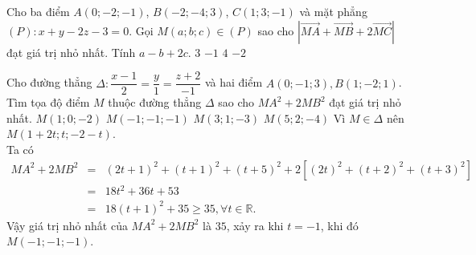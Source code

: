 \begin{ex}
	Cho ba điểm $A(0;-2;-1)$, $B(-2;-4;3)$, $C(1;3;-1)$ và mặt phẳng $(P)\colon x+y-2z-3=0$. Gọi $M(a;b;c)\in (P)$ sao cho $\left|\vec{MA}+\vec{MB}+2\vec{MC}\right|$ đạt giá trị nhỏ nhất. Tính $a-b+2c$.
	\choice
	{$3$}
	{$-1$}
	{$4$}
	{\True $-2$}
\end{ex}
\begin{ex}%
	Cho đường thẳng $\Delta \colon \dfrac{x-1}{2}=\dfrac{y}{1}=\dfrac{z+2}{-1}$ và hai điểm $A(0;-1;3), B(1;-2;1)$. Tìm tọa độ điểm $M$ thuộc đường thẳng $\Delta$ sao cho $MA^2+2MB^2$ đạt giá trị nhỏ nhất.
	\choice
	{$M(1;0;-2)$}
	{\True $M(-1;-1;-1)$}
	{$M(3;1;-3)$}
	{$M(5;2;-4)$}
	\loigiai
	{ Vì $M \in \Delta$ nên $M\left( 1+2t;t;-2-t\right)$.\\
		Ta có
		\begin{eqnarray*}
			MA^2+2MB^2&=&(2t+1)^2+(t+1)^2+(t+5)^2 +2 \left[ (2t)^2+ (t+2)^2 +(t+3)^2\right]\\
			&= & 18t^2 +36t +53\\
			&= & 18(t+1)^2+35 \geq 35, \forall t \in \mathbb{R}.
		\end{eqnarray*}
		Vậy giá trị nhỏ nhất của $MA^2+2MB^2$ là $35$, xảy ra khi $t=-1$, khi đó $M(-1;-1;-1)$.
	}
\end{ex}
